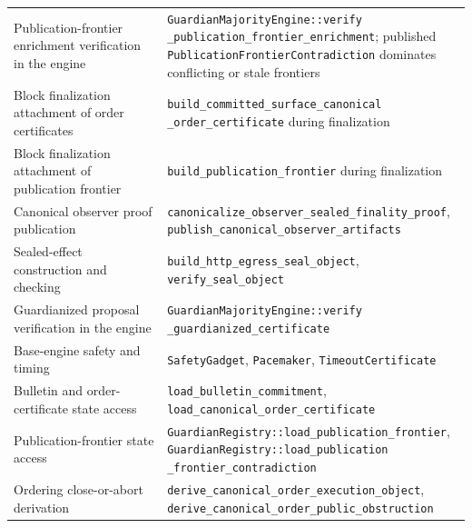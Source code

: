 \documentclass[11pt]{article}
\newcommand{\code}[1]{\texttt{#1}}
\begin{document}
\begin{center}
\begin{tabularx}{\textwidth}{>{\raggedright\arraybackslash}p{} X}
Publication-frontier enrichment verification in the engine & \shortstack[l]{\code{GuardianMajorityEngine::verify}\\\code{\_publication\_frontier\_enrichment}; published\\\code{PublicationFrontierContradiction} dominates\\conflicting or stale frontiers} \\
Block finalization attachment of order certificates & \shortstack[l]{\code{build\_committed\_surface\_canonical}\\\code{\_order\_certificate} during finalization} \\
Block finalization attachment of publication frontier & \code{build\_publication\_frontier} during finalization \\
Canonical observer proof publication & \shortstack[l]{\code{canonicalize\_observer\_sealed\_finality\_proof},\\\code{publish\_canonical\_observer\_artifacts}} \\
Sealed-effect construction and checking & \code{build\_http\_egress\_seal\_object}, \code{verify\_seal\_object} \\
Guardianized proposal verification in the engine & \shortstack[l]{\code{GuardianMajorityEngine::verify}\\\code{\_guardianized\_certificate}} \\
Base-engine safety and timing & \code{SafetyGadget}, \code{Pacemaker}, \code{TimeoutCertificate} \\
Bulletin and order-certificate state access & \shortstack[l]{\code{load\_bulletin\_commitment},\\\code{load\_canonical\_order\_certificate}} \\
Publication-frontier state access & \shortstack[l]{\code{GuardianRegistry::load\_publication\_frontier},\\\code{GuardianRegistry::load\_publication}\\\code{\_frontier\_contradiction}} \\
Ordering close-or-abort derivation & \shortstack[l]{\code{derive\_canonical\_order\_execution\_object},\\\code{derive\_canonical\_order\_public\_obstruction}} \\

\end{tabularx}
\end{center}
\end{document}

